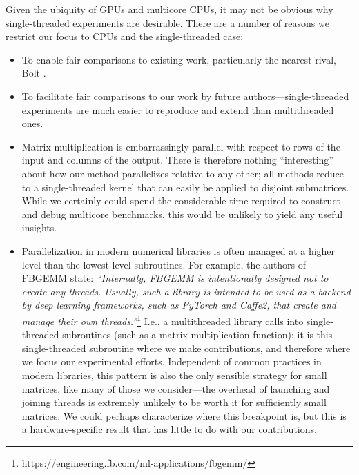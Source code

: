 Given the ubiquity of GPUs and multicore CPUs, it may not be obvious why single-threaded experiments are desirable. There are a number of reasons we restrict our focus to CPUs and the single-threaded case:
\begin{itemize}
    \item To enable fair comparisons to existing work, particularly the nearest rival, Bolt \cite{bolt}.
    \item To facilitate fair comparisons to our work by future authors---single-threaded experiments are much easier to reproduce and extend than multithreaded ones.
    \item Matrix multiplication is embarrassingly parallel with respect to rows of the input and columns of the output. There is therefore nothing ``interesting'' about how our method parallelizes relative to any other; all methods reduce to a single-threaded kernel that can easily be applied to disjoint submatrices. While we certainly could spend the considerable time required to construct and debug multicore benchmarks, this would be unlikely to yield any useful insights.
    \item Parallelization in modern numerical libraries is often managed at a higher level than the lowest-level subroutines. For example, the authors of FBGEMM \cite{fbgemm} state: \textit{``Internally, FBGEMM is intentionally designed not to create any threads. Usually, such a library is intended to be used as a backend by deep learning frameworks, such as PyTorch and Caffe2, that create and manage their own threads.''}\footnote{https://engineering.fb.com/ml-applications/fbgemm/} I.e., a multithreaded library calls into single-threaded subroutines (such as a matrix multiplication function); it is this single-threaded subroutine where we make contributions, and therefore where we focus our experimental efforts. Independent of common practices in modern libraries, this pattern is also the only sensible strategy for small matrices, like many of those we consider---the overhead of launching and joining threads is extremely unlikely to be worth it for sufficiently small matrices. We could perhaps characterize where this breakpoint is, but this is a hardware-specific result that has little to do with our contributions.

\end{itemize}
